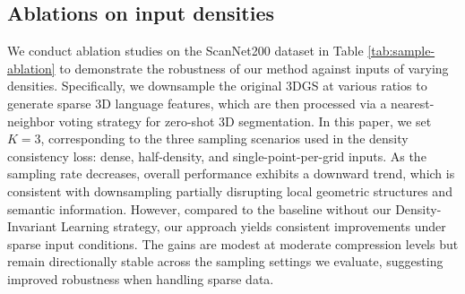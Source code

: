 \subsection{Ablations on input densities}
We conduct ablation studies on the ScanNet200 dataset in Table \ref{tab:sample-ablation} to demonstrate the robustness of our method against inputs of varying densities. Specifically, we downsample the original 3DGS at various ratios to generate sparse 3D language features, which are then processed via a nearest-neighbor voting strategy for zero-shot 3D segmentation.
In this paper, we set $K=3$, corresponding to the three sampling scenarios used in the density consistency loss: dense, half-density, and single-point-per-grid inputs.
As the sampling rate decreases, overall performance exhibits a downward trend, which is consistent with downsampling partially disrupting local geometric structures and semantic information. However, compared to the baseline without our Density-Invariant Learning strategy, our approach yields consistent improvements under sparse input conditions. The gains are modest at moderate compression levels but remain directionally stable across the sampling settings we evaluate, suggesting improved robustness when handling sparse data.


